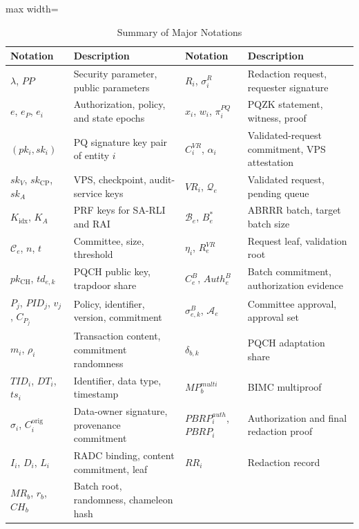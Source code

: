 \documentclass[lettersize,journal]{IEEEtran}
\begin{document}
    \begin{table}[t]
    \centering
    \caption{{Summary of Major Notations}}
    \label{tab:notation}
    \scriptsize
    \renewcommand{\arraystretch}{1.12}
    \setlength{\tabcolsep}{4pt}
    \begin{adjustbox}{max width=\textwidth}
    \begin{tabular}{@{}ll@{\quad}ll@{}}
    \hline
    \textbf{Notation} & \textbf{Description} & \textbf{Notation} & \textbf{Description}\\
    \hline
    $\lambda$, $PP$ & Security parameter, public parameters &
    $R_i$, $\sigma_i^R$ & Redaction request, requester signature\\
    $e$, $e_P$, $e_i$ & Authorization, policy, and state epochs &
    $x_i$, $w_i$, $\pi_i^{PQ}$ & PQZK statement, witness, proof\\
    $(pk_i,sk_i)$ & PQ signature key pair of entity $i$ &
    $C_i^{VR}$, $\alpha_i$ & Validated-request commitment, VPS attestation\\
    $sk_V$, $sk_{\mathrm{CP}}$, $sk_A$ & VPS, checkpoint, audit-service keys &
    $VR_i$, $\mathcal{Q}_e$ & Validated request, pending queue\\
    $K_{\mathrm{idx}}$, $K_A$ & PRF keys for SA-RLI and RAI &
    $\mathcal{B}_e$, $B_e^{*}$ & ABRRR batch, target batch size\\
    $\mathcal{C}_e$, $n$, $t$ & Committee, size, threshold &
    $\eta_i$, $R_e^{VR}$ & Request leaf, validation root\\
    $pk_{\mathrm{CH}}$, $td_{e,k}$ & PQCH public key, trapdoor share &
    $C_e^B$, $Auth_e^B$ & Batch commitment, authorization evidence\\
    $P_j$, $PID_j$, $v_j$, $C_{P_j}$ & Policy, identifier, version, commitment &
    $\sigma_{e,k}^B$, $\mathcal{A}_e$ & Committee approval, approval set\\
    $m_i$, $\rho_i$ & Transaction content, commitment randomness &
    $\delta_{b,k}$ & PQCH adaptation share\\
    $TID_i$, $DT_i$, $ts_i$ & Identifier, data type, timestamp &
    $MP_b^{multi}$ & BIMC multiproof\\
    $\sigma_i$, $C_i^{\mathrm{orig}}$ & Data-owner signature, provenance commitment &
    $PBRP_i^{auth}$, $PBRP_i$ & Authorization and final redaction proof\\
    $I_i$, $D_i$, $L_i$ & RADC binding, content commitment, leaf &
    $RR_i$ & Redaction record\\
    $MR_b$, $r_b$, $CH_b$ & Batch root, randomness, chameleon hash &

\end{tabular}
\end{adjustbox}
\end{table}
\end{document}
